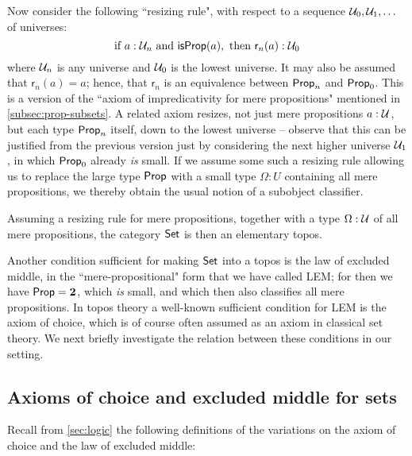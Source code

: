 Now consider the following ``resizing rule", with respect to a sequence $\mathcal{U}_0, \mathcal{U}_1, \ldots$ of universes:
\[\text{if } a:\mathcal{U}_n \text{ and\ } \mathsf{isProp}(a), \text{ then } \mathsf{r}_{n}(a): \mathcal{U}_0\]
where $\mathcal{U}_n$ is any universe and $\mathcal{U}_0$ is the lowest universe.
It may also be assumed that $\mathsf{r}_{n}(a) = a$; hence, that $\mathsf{r}_n$ is an equivalence between $\mathsf{Prop}_n$ and $\mathsf{Prop}_0$. 
This is a version of the ``axiom of impredicativity for mere propositions" mentioned in \autoref{subsec:prop-subsets}.  A related axiom resizes, not just mere propositions $a:\mathcal{U}$, but each type $\mathsf{Prop}_n$ itself, down to the lowest universe -- observe that this can be justified from the previous version just by considering the next higher universe $\mathcal{U}_1$, in which $\mathsf{Prop}_0$ already \emph{is} small.
If we assume some such a resizing rule allowing us to replace the large type $\mathsf{Prop}$ with a small type $\Omega:U$ containing all mere propositions, we thereby obtain the usual notion of a subobject classifier.
 
 \begin{thm} Assuming a resizing rule for mere propositions, together with a type $\Omega:\mathcal{U}$ of all mere propositions, the category $\mathsf{Set}$ is then an elementary  topos.
 \end{thm}

Another condition sufficient for making $\mathsf{Set}$ into a topos is the law of excluded middle, in the ``mere-propositional" form that we have called LEM; for then we have $\mathsf{Prop} = \mathbf{2}$, which \emph{is} small, and which then also classifies all mere propositions.
In topos theory a well-known sufficient condition for LEM is the axiom of choice, which is of course often assumed as an axiom in classical set theory. We next briefly investigate the relation between these conditions in our setting.

\subsection{Axioms of choice and excluded middle for sets}
\label{subsec:emacinsets}

%
Recall from \autoref{sec:logic}  the following definitions of the variations on the axiom of choice and the law of excluded middle:

